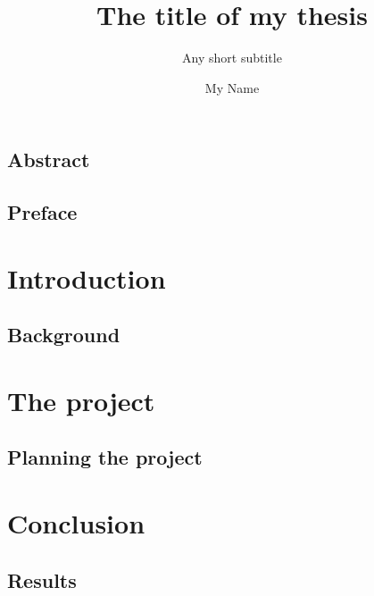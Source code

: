 \documentclass[UKenglish]{ifimaster}  %
\title{The title of my thesis}        %
\subtitle{Any short subtitle}         %
\author{My Name}                      %
\begin{document}
\duoforside[dept={Department of Informatics},   %
  program={Network and system administration},  %
  short]                                        %

\frontmatter{}



\chapter*{Abstract}                   %

\tableofcontents{}
\listoffigures{}
\listoftables{}

\chapter*{Preface}                    %

\mainmatter{}
\part{Introduction}                   %

\chapter{Background}                  %


\part{The project}                    %

\chapter{Planning the project}        %


\part{Conclusion}                     %

\chapter{Results}                     %


\backmatter{}
\printbibliography
\end{document}
